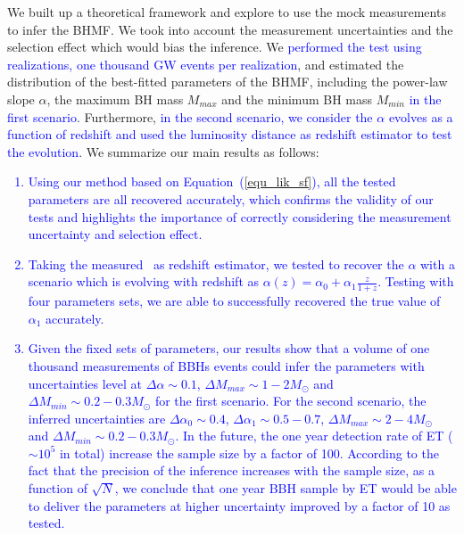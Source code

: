 \documentclass[twocolumn]{aastex62}
\newcommand{\blue}[1]{\textcolor{blue}{#1}}
\begin{document}
We built up a theoretical framework and explore to use the mock measurements to infer the BHMF. We took into account the measurement uncertainties and the selection effect which would bias the inference. We \blue{performed the test using realizations, one thousand GW events per realization}, and estimated the distribution of the best-fitted parameters of the BHMF, including the power-law slope $\alpha$, the maximum BH mass $M_{max}$ and the minimum BH mass $M_{min}$ \blue{in the first scenario}. Furthermore, \blue{in the second scenario, we consider the $\alpha$ evolves as a function of redshift and used the luminosity distance as redshift estimator to test the evolution}. We summarize our main results as follows:
\blue{
\begin{enumerate}
\item Using our method based on Equation~(\ref{equ_lik_sf}), all the tested parameters are all recovered accurately, which confirms the validity of our tests and highlights the importance of correctly considering the measurement uncertainty and selection effect.
\item Taking the measured \dl\ as redshift estimator, we tested to recover the $\alpha$ with a scenario which is evolving with redshift as $\alpha(z) = \alpha_0 + \alpha_1\frac{z}{1+z}$. Testing with four parameters sets, we are able to successfully recovered the true value of $\alpha_1$ accurately.
\item Given the fixed sets of parameters, our results show that a volume of one thousand measurements of BBHs events could infer the parameters with uncertainties level at $\Delta\alpha\sim0.1$, $\Delta M_{max}\sim1-2M_{\odot}$ and $\Delta M_{min}\sim0.2-0.3M_{\odot}$ for the first scenario. For the second scenario, the inferred uncertainties are $\Delta\alpha_0\sim0.4$, $\Delta\alpha_1\sim0.5-0.7$, $\Delta M_{max}\sim2-4M_{\odot}$ and $\Delta M_{min}\sim0.2-0.3M_{\odot}$. In the future, the one year detection rate of ET ($\sim10^5$ in total) increase the sample size by a factor of 100. According to the fact that the precision of the inference increases with the sample size, as a function of $\sqrt{N}$, we conclude that one year BBH sample by ET would be able to deliver the parameters at higher uncertainty improved by a factor of 10 as tested.
\end{enumerate}
}
\end{document}
